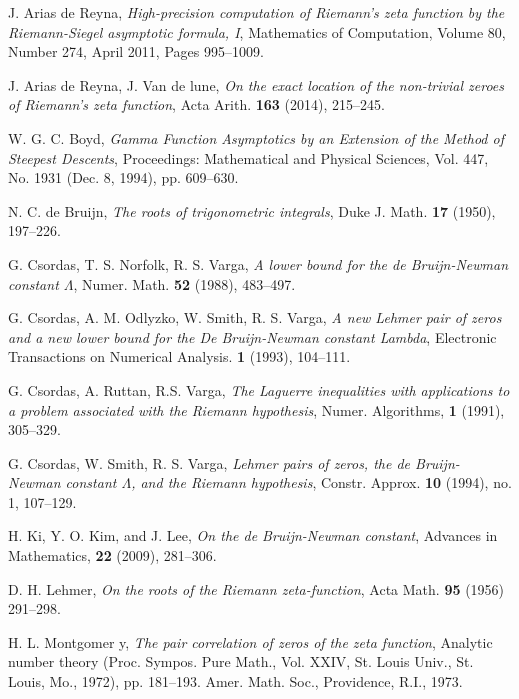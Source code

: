 \documentclass[a4paper,11pt,twoside]{amsart}
\begin{document}
\begin{thebibliography}{99} 

J. Arias de Reyna, \emph{High-precision computation of Riemann's zeta function by the Riemann-Siegel asymptotic formula, I}, Mathematics of Computation, Volume 80, Number 274, April 2011, Pages 995–1009.

J. Arias de Reyna, J. Van de lune, \emph{On the exact location of the non-trivial zeroes of Riemann's zeta function}, Acta Arith. \textbf{163} (2014), 215--245.

W. G. C. Boyd, \emph{Gamma Function Asymptotics by an Extension of the Method of Steepest Descents}, Proceedings: Mathematical and Physical Sciences, Vol. 447, No. 1931 (Dec. 8, 1994), pp. 609--630.

N. C. de Bruijn, \emph{The roots of trigonometric integrals}, Duke J. Math. \textbf{17} (1950), 197--226.

%

G. Csordas, T. S. Norfolk, R. S. Varga, \emph{A lower bound for the de Bruijn-Newman constant $\Lambda$}, Numer. Math. \textbf{52} (1988), 483--497.

G. Csordas, A. M. Odlyzko, W. Smith, R. S. Varga, \emph{A new Lehmer pair of zeros and a new lower bound for the De Bruijn-Newman constant Lambda}, Electronic Transactions on Numerical Analysis. \textbf{1} (1993), 104--111.

G. Csordas, A. Ruttan, R.S. Varga, \emph{The Laguerre inequalities with applications
to a problem associated with the Riemann hypothesis}, Numer. Algorithms, \textbf{1} (1991), 305--329.

G. Csordas, W. Smith, R. S. Varga, \emph{Lehmer pairs of zeros, the de Bruijn-Newman constant $\Lambda$, and the Riemann hypothesis},  Constr. Approx. \textbf{10} (1994), no. 1, 107--129. 

H. Ki, Y. O. Kim, and J. Lee, \emph{On the de Bruijn-Newman constant}, Advances in Mathematics, \textbf{22} (2009), 281--306.

D. H. Lehmer, \emph{On the roots of the Riemann zeta-function}, Acta Math. \textbf{95} (1956) 291--298.

H. L. Montgomer
y, \emph{The pair correlation of zeros of the zeta function}, Analytic number theory (Proc. Sympos. Pure Math., Vol. XXIV, St. Louis Univ., St. Louis, Mo., 1972), pp. 181--193. Amer. Math. Soc., Providence, R.I., 1973.


\end{thebibliography}
\end{document}
